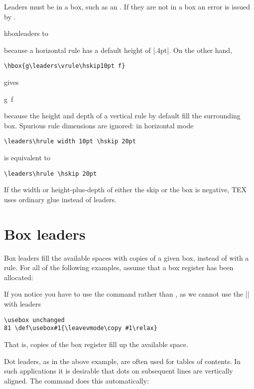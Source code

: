 Leaders must be in a box, such as an . If they are not in a box an error is issued by \tex.

\begin{texexample}{}{hboxleaders}
\hbox to 
\end{texexample}

because a horizontal rule has a default height of |.4pt|. On the other hand,

\verb+\hbox{g\leaders\vrule\hskip10pt f}+

gives

\hbox{g\leaders\vrule\hskip10pt f}

because the height and depth of a vertical rule by default fill the surrounding box.
Spurious rule dimensions are ignored: in horizontal mode

\verb+\leaders\hrule width 10pt \hskip 20pt+

is equivalent to

\verb+\leaders\hrule \hskip 20pt+

If the width or height-plus-depth of either the skip or the box is negative, TEX uses ordinary glue
instead of leaders.

\section{Box leaders}

Box leaders fill the available spaces with copies of a given box, instead of with a rule. For all of the following examples, assume that a box register has been allocated:


If you notice you have to use the  command rather than , as we cannot use the |\leavevmode| with leaders

\begin{verbatim}
\usebox unchanged
81 \def\usebox#1{\leavevmode\copy #1\relax}
\end{verbatim}

That is, copies of the box register fill up the available space.

Dot leaders, as in the above example, are often used for tables of contents. In such applications it
is desirable that dots on subsequent lines are vertically aligned. The command does this
automatically:


